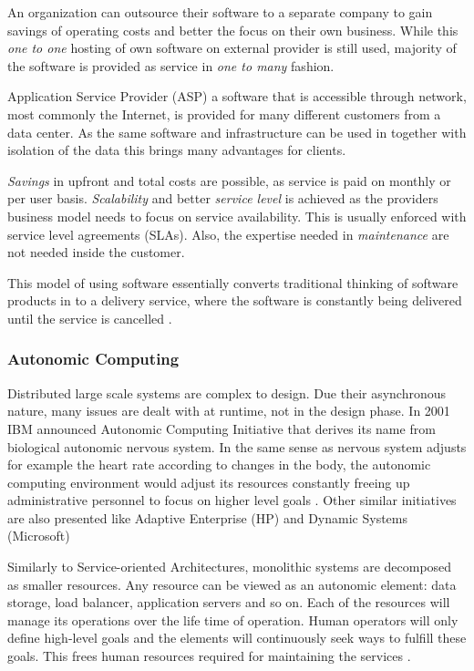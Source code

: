\documentclass{tktltiki}
\begin{document}
An organization can outsource their software to a separate company to gain savings of operating costs and better the focus on their own business.  While this \emph{one to one} hosting of own software on external provider is still used, majority of the software is provided as service in \emph{one to many} fashion.

Application Service Provider (ASP) a software that is accessible through network, most commonly the Internet, is provided for many different customers from a data center.  As the same software and infrastructure can be used in together with isolation of the data this brings many advantages for clients.

\emph{Savings} in upfront and total costs are possible, as service is paid on monthly or per user basis. \emph{Scalability} and better \emph{service level} is achieved as the providers business model needs to focus on service availability.  This is usually enforced with service level agreements (SLAs).  Also, the expertise needed in \emph{maintenance} are not needed inside the customer.

This model of using software essentially converts traditional thinking of software products in to a delivery service, where the software is constantly being delivered until the service is cancelled \cite{asp}.


\subsubsection{Autonomic Computing}

Distributed large scale systems are complex to design.  Due their asynchronous nature, many issues are dealt with at runtime, not in the design phase.  In 2001 IBM announced Autonomic Computing Initiative that derives its name from biological autonomic nervous system.  In the same sense as nervous system adjusts for example the heart rate according to changes in the body, the autonomic computing environment would adjust its resources constantly freeing up administrative personnel to focus on higher level goals \cite{autonomic_vision}.  Other similar initiatives are also presented like Adaptive Enterprise (HP) and Dynamic Systems (Microsoft) \cite{autonomic_research}

Similarly to Service-oriented Architectures, monolithic systems are decomposed as smaller resources.  Any resource can be viewed as an autonomic element: data storage, load balancer, application servers and so on.  Each of the resources will manage its operations over the life time of operation.  Human operators will only define high-level goals and the elements will continuously seek ways to fulfill these goals.  This frees human resources required for maintaining the services \cite{autonomic_research}.
\end{document}
